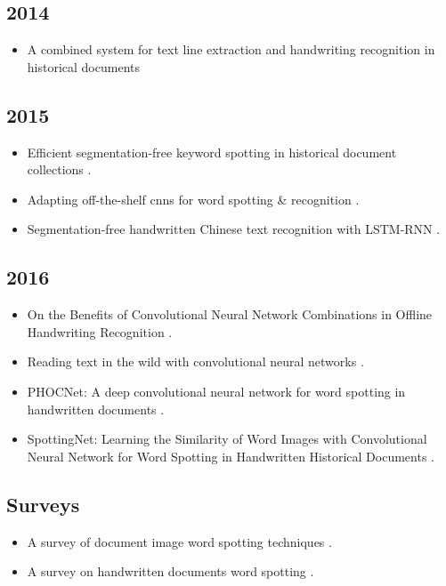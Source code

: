 \documentclass[final]{ukthesis}
\begin{document}
\subsection{2014}
\begin{itemize}
\item A combined system for text line extraction and handwriting recognition in historical documents \cite{fischer2014combined}
\end{itemize}

\subsection{2015}
\begin{itemize}
\item Efficient segmentation-free keyword spotting in historical document collections \cite{rusinol2015efficient}.
\item Adapting off-the-shelf cnns for word spotting \& recognition \cite{sharma2015adapting}.
\item Segmentation-free handwritten Chinese text recognition with LSTM-RNN \cite{messina2015segmentation}.
\end{itemize}

\subsection{2016}
\begin{itemize}
\item On the Benefits of Convolutional Neural Network Combinations in Offline Handwriting Recognition \cite{suryani2016benefits}.
\item Reading text in the wild with convolutional neural networks \cite{jaderberg2016reading}.
\item PHOCNet: A deep convolutional neural network for word spotting in handwritten documents \cite{sudholt2016phocnet}.
\item SpottingNet: Learning the Similarity of Word Images with Convolutional Neural Network for Word Spotting in Handwritten Historical Documents \cite{zhong2016spottingnet}.
\end{itemize}



\subsection{Surveys}
\begin{itemize}
\item A survey of document image word spotting techniques \cite{giotis2017survey}.

\item A survey on handwritten documents word spotting \cite{ahmed2017survey}.
\end{itemize}
\copyrightnotice
\end{document}
